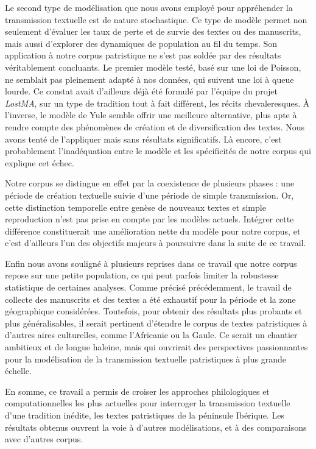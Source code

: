 \documentclass[a4paper,twoside,12pt]{book}
\begin{document}
Le second type de modélisation que nous avons employé pour appréhender la transmission textuelle est de nature stochastique. Ce type de modèle permet non seulement d’évaluer les taux de perte et de survie des textes ou des manuscrits, mais aussi d’explorer des dynamiques de population au fil du temps. Son application à notre corpus patristique ne s’est pas soldée par des résultats véritablement concluants.
Le premier modèle testé, basé sur une loi de Poisson, ne semblait pas pleinement adapté à nos données, qui suivent une loi à queue lourde. Ce constat avait d’ailleurs déjà été formulé par l’équipe du projet \textit{LostMA}, sur un type de tradition tout à fait différent, les récits chevaleresques. À l’inverse, le modèle de Yule semble offrir une meilleure alternative, plus apte à rendre compte des phénomènes de création et de diversification des textes. Nous avons tenté de l’appliquer mais sans résultats significatifs. Là encore, c’est probablement l’inadéquation entre le modèle et les spécificités de notre corpus qui explique cet échec.

Notre corpus se distingue en effet par la coexistence de plusieurs phases : une période de création textuelle suivie d’une période de simple transmission. Or, cette distinction temporelle entre genèse de nouveaux textes et simple reproduction  n’est pas prise en compte par les modèles actuels. Intégrer cette différence constituerait une amélioration nette du modèle pour notre corpus, et c’est d’ailleurs l’un des objectifs majeurs à poursuivre dans la suite de ce travail.

Enfin nous avons souligné à plusieurs reprises dans ce travail que notre corpus repose sur une petite population, ce qui peut parfois limiter la robustesse statistique de certaines analyses. Comme précisé précédemment, le travail de collecte des manuscrits et des textes a été exhaustif pour la période et la zone géographique considérées. Toutefois, pour obtenir des résultats plus probants et plus généralisables, il serait pertinent d’étendre le corpus de textes patristiques à d’autres aires culturelles, comme l’Africanie ou la Gaule. Ce serait un chantier ambitieux et de longue haleine, mais qui ouvrirait des perspectives passionnantes pour la modélisation de la transmission textuelle patristiques à plus grande échelle.

En somme, ce travail a permis de croiser les approches philologiques et computationnelles les plus actuelles pour interroger la transmission textuelle d'une tradition inédite, les textes patristiques de la péninsule Ibérique. Les résultats obtenus ouvrent la voie à d'autres modélisations, et à des comparaisons avec d'autres corpus.
\end{document}
